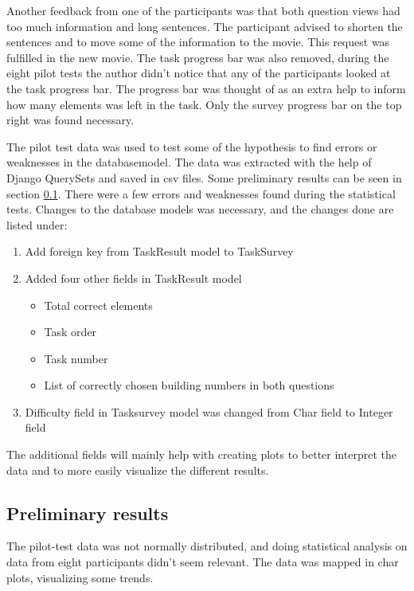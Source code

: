 Another feedback from one of the participants was that both question views had too much information and long sentences. The participant advised to shorten the sentences and to move some of the information to the movie. This request was fulfilled in the new movie. The task progress bar was also removed, during the eight pilot tests the author didn't notice that any of the participants looked at the task progress bar. The progress bar was thought of as an extra help to inform how many elements was left in the task. Only the survey progress bar on the top right was found necessary. 

The pilot test data was used to test some of the hypothesis to find errors or weaknesses in the databasemodel. The data was extracted with the help of Django QuerySets and saved in csv files. Some preliminary results can be seen in section \ref{sec:preliminalyresult}. There were a few errors and weaknesses found during the statistical tests. Changes to the database models was necessary, and the changes done are listed under: 

\begin{enumerate}
	\item Add foreign key from TaskResult model to TaskSurvey
	\item Added four other fields in TaskResult model
	\begin{itemize}
		\item Total correct elements 
		\item Task order
		\item Task number
		\item List of correctly chosen building numbers in both questions
	\end{itemize}
	\item Difficulty field in Tasksurvey model was changed from Char field to Integer field
\end{enumerate}

The additional fields will mainly help with creating plots to better interpret the data and to more easily visualize the different results. 

\subsection{Preliminary results}\label{sec:preliminalyresult}
The pilot-test data was not normally distributed, and doing statistical analysis on data from eight participants didn't seem relevant. The data was mapped in char plots, visualizing some trends. 

